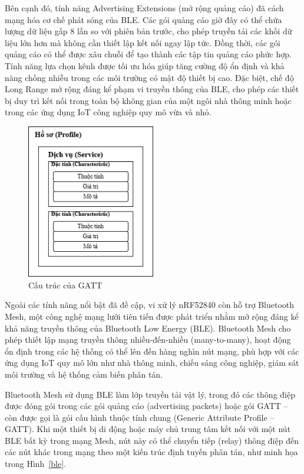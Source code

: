 Bên cạnh đó, tính năng Advertising Extensions (mở rộng quảng cáo) đã cách mạng hóa cơ chế phát sóng của BLE. Các gói quảng cáo giờ đây có thể chứa lượng dữ liệu gấp 8 lần so với phiên bản trước, cho phép truyền tải các khối dữ liệu lớn hơn mà không cần thiết lập kết nối ngay lập tức. Đồng thời, các gói quảng cáo có thể được xâu chuỗi để tạo thành các tập tin quảng cáo phức hợp. Tính năng lựa chọn kênh được tối ưu hóa giúp tăng cường độ ổn định và khả năng chống nhiễu trong các môi trường có mật độ thiết bị cao. Đặc biệt, chế độ Long Range mở rộng đáng kể phạm vi truyền thông của BLE, cho phép các thiết bị duy trì kết nối trong toàn bộ không gian của một ngôi nhà thông minh hoặc trong các ứng dụng IoT công nghiệp quy mô vừa và nhỏ.




\begin{figure}[!ht]
	\centering
 	\includegraphics[width=0.5\textwidth]{images/gatt.drawio.png}
	\caption{Cấu trúc của GATT}
	\label{gatt}
\end{figure}

Ngoài các tính năng nổi bật đã đề cập, vi xử lý nRF52840 còn hỗ trợ Bluetooth Mesh, một công nghệ mạng lưới tiên tiến được phát triển nhằm mở rộng đáng kể khả năng truyền thông của Bluetooth Low Energy (BLE). Bluetooth Mesh cho phép thiết lập mạng truyền thông nhiều-đến-nhiều (many-to-many), hoạt động ổn định trong các hệ thống có thể lên đến hàng nghìn nút mạng, phù hợp với các ứng dụng IoT quy mô lớn như nhà thông minh, chiếu sáng công nghiệp, giám sát môi trường và hệ thống cảm biến phân tán.

Bluetooth Mesh sử dụng BLE làm lớp truyền tải vật lý, trong đó các thông điệp được đóng gói trong các gói quảng cáo (advertising packets) hoặc gói GATT – còn được gọi là gói cấu hình thuộc tính chung (Generic Attribute Profile – GATT). Khi một thiết bị di động hoặc máy chủ trung tâm kết nối với một nút BLE bất kỳ trong mạng Mesh, nút này có thể chuyển tiếp (relay) thông điệp đến các nút khác trong mạng theo một kiến trúc định tuyến phân tán, như minh họa trong Hình~\ref{ble}.

